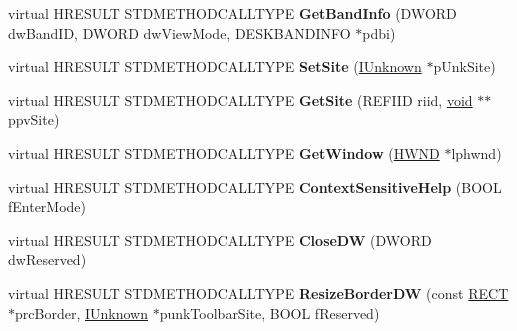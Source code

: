 \begin{DoxyCompactItemize}
\item 
\mbox{\label{class_c_tools_band_acb1b9328cba15048b7219b178e835bce}} 
virtual H\+R\+E\+S\+U\+LT S\+T\+D\+M\+E\+T\+H\+O\+D\+C\+A\+L\+L\+T\+Y\+PE {\bfseries Get\+Band\+Info} (D\+W\+O\+RD dw\+Band\+ID, D\+W\+O\+RD dw\+View\+Mode, D\+E\+S\+K\+B\+A\+N\+D\+I\+N\+FO $\ast$pdbi)
\item 
\mbox{\label{class_c_tools_band_a3d125a3b7c3e4bfa6c393313961092fe}} 
virtual H\+R\+E\+S\+U\+LT S\+T\+D\+M\+E\+T\+H\+O\+D\+C\+A\+L\+L\+T\+Y\+PE {\bfseries Set\+Site} (\hyperlink{interface_i_unknown}{I\+Unknown} $\ast$p\+Unk\+Site)
\item 
\mbox{\label{class_c_tools_band_acc2ecde024d9e75d61a81703a569ce50}} 
virtual H\+R\+E\+S\+U\+LT S\+T\+D\+M\+E\+T\+H\+O\+D\+C\+A\+L\+L\+T\+Y\+PE {\bfseries Get\+Site} (R\+E\+F\+I\+ID riid, \hyperlink{interfacevoid}{void} $\ast$$\ast$ppv\+Site)
\item 
\mbox{\label{class_c_tools_band_aefee433a9b42c8865514c377b4bc6498}} 
virtual H\+R\+E\+S\+U\+LT S\+T\+D\+M\+E\+T\+H\+O\+D\+C\+A\+L\+L\+T\+Y\+PE {\bfseries Get\+Window} (\hyperlink{interfacevoid}{H\+W\+ND} $\ast$lphwnd)
\item 
\mbox{\label{class_c_tools_band_a78ffcfa91820641a83d925742157e3aa}} 
virtual H\+R\+E\+S\+U\+LT S\+T\+D\+M\+E\+T\+H\+O\+D\+C\+A\+L\+L\+T\+Y\+PE {\bfseries Context\+Sensitive\+Help} (B\+O\+OL f\+Enter\+Mode)
\item 
\mbox{\label{class_c_tools_band_ad0bbdf5dfa1f8d23ec656dd715c8c4c7}} 
virtual H\+R\+E\+S\+U\+LT S\+T\+D\+M\+E\+T\+H\+O\+D\+C\+A\+L\+L\+T\+Y\+PE {\bfseries Close\+DW} (D\+W\+O\+RD dw\+Reserved)
\item 
\mbox{\label{class_c_tools_band_a955584a4ed1bda7535edd501767b2a77}} 
virtual H\+R\+E\+S\+U\+LT S\+T\+D\+M\+E\+T\+H\+O\+D\+C\+A\+L\+L\+T\+Y\+PE {\bfseries Resize\+Border\+DW} (const \hyperlink{structtag_r_e_c_t}{R\+E\+CT} $\ast$prc\+Border, \hyperlink{interface_i_unknown}{I\+Unknown} $\ast$punk\+Toolbar\+Site, B\+O\+OL f\+Reserved)
\item 
\mbox{\label{class_c_tools_band_a648f0fa5e6b852106b630f3be9a71aa9}} 
$$
\end{DoxyCompactItemize}
